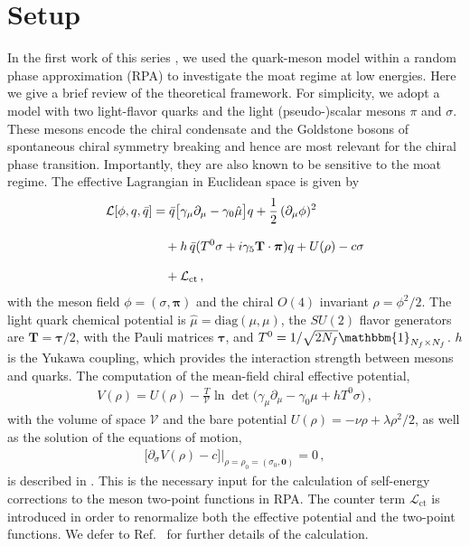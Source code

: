 \documentclass[reprint,english,superscriptaddress,preprintnumbers,amsmath,amssymb,aps,prd]{revtex4-2}
\begin{document}
\section{Setup}\label{sec:LEFT}
%
In the first work of this series \cite{Rennecke:2025kub}, we used the quark-meson model within a random phase approximation (RPA) to investigate the moat regime at low energies. Here we give a brief review of the theoretical framework. For simplicity, we adopt a model with two light-flavor quarks and the light (pseudo-)scalar mesons $\pi$ and $\sigma$. These mesons encode the chiral condensate and the Goldstone bosons of spontaneous chiral symmetry breaking and hence are most relevant for the chiral phase transition. Importantly, they are also known to be sensitive to the moat regime. The effective Lagrangian in Euclidean space is given by
%
\begin{align} \label{eq:L}
\begin{split} 
\mathcal{L}[\phi,q,\bar{q}]&=\bar{q}\big[\gamma_\mu\partial_\mu-\gamma_0 \hat{\mu}\big]q+\frac{1}{2}\,(\partial_\mu\phi)^2\\[2ex]
&\quad+h\,\bar{q}(T^0\sigma+i\gamma_5\mathbf{T}\cdot\boldsymbol{\pi})q+U(\rho)-c\sigma\\[2ex]
&\quad+ \mathcal{L}_{\rm ct}\,,
\end{split}
\end{align}
%
with the meson field $\phi=(\sigma,\boldsymbol{\pi})$ and the chiral $O(4)$ invariant $\rho =\phi^2/2$.
The light quark chemical potential is $\hat{\mu}=\mathrm{diag}(\mu,\mu)$, the $SU(2)$ flavor generators are $\mathbf{T} = \boldsymbol{\tau}/2$, with the Pauli matrices $\boldsymbol{\tau}$, and $T^0=1/\sqrt{2N_f} \mathbbm{1}_{N_f\times N_f}$. $h$ is the Yukawa coupling, which provides the interaction strength between mesons and quarks. The computation of the mean-field chiral effective potential,
\begin{align}
V(\rho) = U(\rho) - \frac{T}{\mathcal{V}} \ln \det\big( \gamma_\mu\partial_\mu - \gamma_0\mu + h T^0\sigma \big)\,,
\end{align}
with the volume of space $\mathcal{V}$ and the bare potential $U(\rho) = -\nu\rho + \lambda\rho^2/2$, as well as the solution of the equations of motion, 
\begin{align}
\big[\partial_\sigma V(\rho) -c\big]\Big|_{\rho = \rho_0 = (\sigma_0, \boldsymbol{0})} = 0\,,
\end{align}
is described in \cite{Rennecke:2025kub}. This is the necessary input for the calculation of self-energy corrections to the meson two-point functions in RPA. The counter term $\mathcal{L}_{\mathrm{ct}}$ is introduced in order to renormalize both the effective potential and the two-point functions.  We defer to Ref.\ \cite{Rennecke:2025kub} for further details of the calculation.
\end{document}

